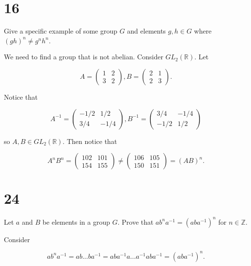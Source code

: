 \documentclass[a4paper]{article}
\begin{document}
\section*{16}

Give a specific example of some group $G$ and elements $g, h \in G$ where $(gh)^n \neq g^n h^n$. 

\vspace{\baselineskip}

We need to find a group that is not abelian. Consider $GL_2(\mathbb{R})$. Let 

$$A = 
  \begin{pmatrix}
    1 & 2 \\
    3 & 2
  \end{pmatrix},
  B = 
  \begin{pmatrix}
    2 & 1 \\
    2 & 3
  \end{pmatrix}.
$$

Notice that 

$$A^{-1} = 
  \begin{pmatrix}
    -1/2 & 1/2 \\
    3/4 & -1/4
  \end{pmatrix},
  B^{-1} = 
  \begin{pmatrix}
    3/4 & -1/4 \\
    -1/2 & 1/2 
  \end{pmatrix}
$$

so $A, B \in GL_2(\mathbb{R})$. Then notice that 

$$A^n B^n = \begin{pmatrix}
    102 & 101 \\
    154 & 155
  \end{pmatrix} \neq 
    \begin{pmatrix}
    106 & 105 \\
    150 & 151 
  \end{pmatrix} = (AB)^n.$$

\section*{24}

Let $a$ and $B$ be elements in a group $G$. Prove that $ab^na^{-1} = (aba^{-1})^n$ for $n \in \mathbb{Z}$.

\vspace{\baselineskip}

Consider

$$ab^na^{-1} = a b ... b  a^{-1} = a  b a^{-1} a ... a^{-1} a b a^{-1} = (aba^{-1})^n.$$
\end{document}
